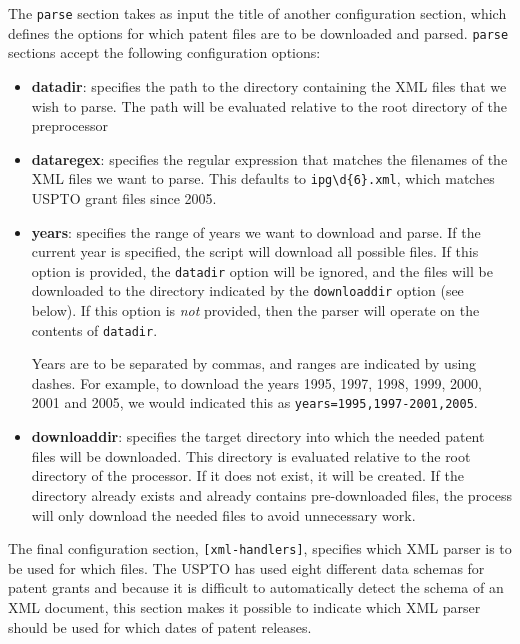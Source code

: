 \documentclass[11pt]{article}
\begin{document}
The \verb`parse` section takes as input the title of another configuration
section, which defines the options for which patent files are to be downloaded
and parsed. \verb`parse` sections accept the following configuration options:

\begin{itemize}

    \item \textbf{datadir}: specifies the path to the directory containing the
        XML files that we wish to parse. The path will be evaluated relative to
        the root directory of the preprocessor

    \item \textbf{dataregex}: specifies the regular expression that matches the
        filenames of the XML files we want to parse. This defaults to
        \verb`ipg\d{6}.xml`, which matches USPTO grant files since 2005.

    \item \textbf{years}: specifies the range of years we want to download and
        parse.  If the current year is specified, the script will download all
        possible files. If this option is provided, the \verb`datadir` option
        will be ignored, and the files will be downloaded to the directory
        indicated by the \verb`downloaddir` option (see below). If this option
        is \emph{not} provided, then the parser will operate on the contents of
        \verb`datadir`.

        Years are to be separated by commas, and ranges are indicated by using
        dashes. For example, to download the years 1995, 1997, 1998, 1999,
        2000, 2001 and 2005, we would indicated this as
        \verb`years=1995,1997-2001,2005`.
    
    \item \textbf{downloaddir}: specifies the target directory into which the
        needed patent files will be downloaded. This directory is evaluated
        relative to the root directory of the processor. If it does not exist,
        it will be created. If the directory already exists and already
        contains pre-downloaded files, the process will only download the
        needed files to avoid unnecessary work.

\end{itemize}

The final configuration section, \verb`[xml-handlers]`, specifies which XML
parser is to be used for which files. The USPTO has used eight different data
schemas for patent grants and because it is difficult to automatically detect
the schema of an XML document, this section makes it possible to indicate which
XML parser should be used for which dates of patent releases.
\end{document}
